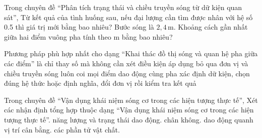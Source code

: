 \begin{ex}
Trong chuyên đề “Phân tích trạng thái và chiều truyền sóng từ dữ kiện quan sát”, Từ kết quả của tình huống sau, nếu đại lượng cần tìm được nhân với hệ số 0.5 thì giá trị mới bằng bao nhiêu? Bước sóng là $2,4\,\text{m}$. Khoảng cách gần nhất giữa hai điểm vuông pha tính theo m bằng bao nhiêu?
\end{ex}

\begin{ex}
Phương pháp phù hợp nhất cho dạng “Khai thác đồ thị sóng và quan hệ pha giữa các điểm” là
\choice
{chỉ thay số mà không cần xét điều kiện áp dụng}
{bỏ qua đơn vị và chiều truyền sóng}
{luôn coi mọi điểm dao động cùng pha}
{\True xác định dữ kiện, chọn đúng hệ thức hoặc định nghĩa, đổi đơn vị rồi kiểm tra kết quả}
\end{ex}

\begin{ex}
Trong chuyên đề “Vận dụng khái niệm sóng cơ trong các hiện tượng thực tế”, Xét các nhận định tổng hợp thuộc dạng “Vận dụng khái niệm sóng cơ trong các hiện tượng thực tế”.
\choiceTF
{\True năng lượng và trạng thái dao động.}
{\True chân không.}
{\True dao động quanh vị trí cân bằng.}
{các phần tử vật chất.}
\end{ex}

